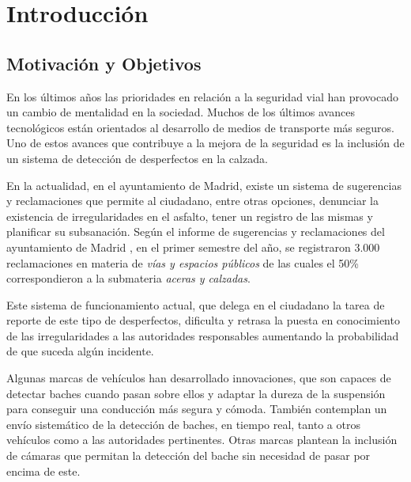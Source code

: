 \section{Introducción}

\subsection{Motivación y Objetivos}

En los últimos años las prioridades en relación a la seguridad vial han provocado un cambio de mentalidad en la sociedad.  Muchos de los últimos avances tecnológicos están orientados al desarrollo de medios de transporte más seguros. Uno de estos avances que contribuye a la mejora de la seguridad es la inclusión de un sistema de detección de desperfectos en la calzada.


En la actualidad, en el ayuntamiento de Madrid, existe un sistema de sugerencias y reclamaciones \cite{s1_syr} que permite al ciudadano, entre otras opciones, denunciar la existencia de irregularidades en el asfalto, tener un registro de las mismas y planificar su subsanación. Según el informe de sugerencias y reclamaciones del ayuntamiento de Madrid \cite{s1_syrreport}, en el primer semestre del año, se registraron 3.000 reclamaciones en materia de \textit{vías y espacios públicos} de las cuales el 50\% correspondieron a la submateria \textit{aceras y calzadas}.

Este sistema de funcionamiento actual, que delega en el ciudadano la tarea de reporte de este tipo de desperfectos, dificulta y retrasa la puesta en conocimiento de las irregularidades a las autoridades responsables aumentando la probabilidad de que suceda algún incidente.

Algunas marcas de vehículos han desarrollado innovaciones, que son capaces de detectar baches cuando pasan sobre ellos y adaptar la dureza de la suspensión para conseguir una conducción más segura y cómoda. También contemplan un envío sistemático de la detección de baches, en tiempo real, tanto a otros vehículos como a las autoridades pertinentes. Otras marcas plantean la inclusión de cámaras que permitan la detección del bache sin necesidad de pasar por encima de este.

